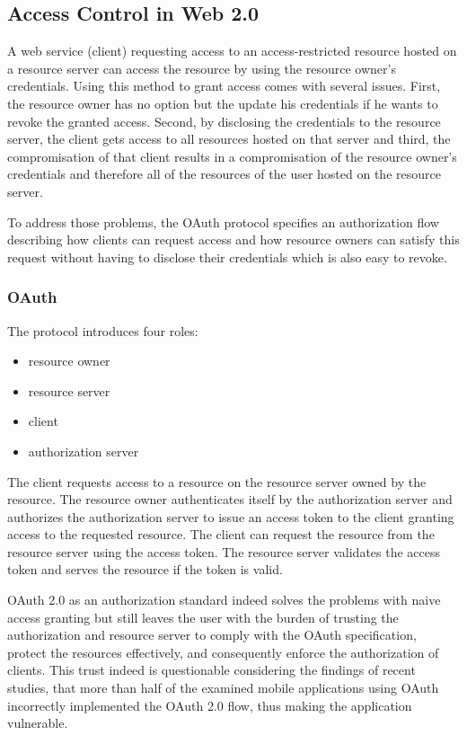 \documentclass[conference]{IEEEtran}
\begin{document}
\subsection{Access Control in Web 2.0}
A web service (client) requesting access to an access-restricted resource hosted on a resource server can access the resource by using the resource owner's credentials.
Using this method to grant access comes with several issues.
First, the resource owner has no option but the update his credentials if he wants to revoke the granted access.
Second, by disclosing the credentials to the resource server, the client gets access to all resources hosted on that server and third, the compromisation of that client results in a compromisation of the resource owner's credentials and therefore all of the resources of the user hosted on the resource server.

To address those problems, the OAuth protocol specifies an authorization flow describing how clients can request access and how resource owners can satisfy this request without having to disclose their credentials which is also easy to revoke. \cite{hardt_oauth_2012}

\subsubsection*{OAuth}
The protocol introduces four roles:

\begin{itemize}
  \item resource owner
  \item resource server
  \item client
  \item authorization server
\end{itemize}

The client requests access to a resource on the resource server owned by the resource.
The resource owner authenticates itself by the authorization server and authorizes the authorization server to issue an access token to the client granting access to the requested resource.
The client can request the resource from the resource server using the access token.
The resource server validates the access token and serves the resource if the token is valid.

OAuth 2.0 as an authorization standard indeed solves the problems with naive access granting but still leaves the user with the burden of trusting the authorization and resource server to comply with the OAuth specification, protect the resources effectively, and consequently enforce the authorization of clients.
This trust indeed is questionable considering the findings of recent studies, that more than half of the examined mobile applications using OAuth incorrectly implemented the OAuth 2.0 flow, thus making the application vulnerable. \cite{chen_oauth_2014}
\end{document}
